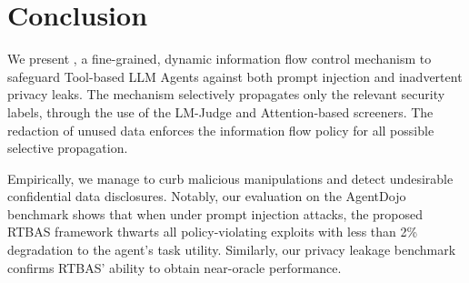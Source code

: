\section{Conclusion}

We present \sysname, a fine-grained, dynamic information flow control mechanism to safeguard Tool-based LLM Agents against both prompt injection and inadvertent privacy leaks. The mechanism selectively propagates only the relevant security labels, through the use of the LM-Judge and Attention-based screeners. The redaction of unused data enforces the information flow policy for all possible selective propagation. 

Empirically, we manage to curb malicious manipulations and detect undesirable confidential data disclosures. Notably, our evaluation on the AgentDojo benchmark shows that when under prompt injection attacks, the proposed RTBAS framework thwarts all policy-violating exploits with less than 2\% degradation to the agent’s task utility. Similarly, our privacy leakage benchmark confirms RTBAS' ability to obtain near-oracle performance.

